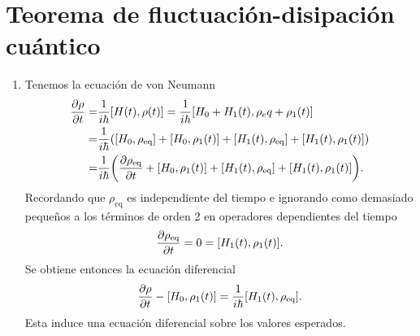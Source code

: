 \documentclass{article}
\begin{document}
\section{Teorema de fluctuación-disipación cuántico}

\begin{enumerate}

\item Tenemos la ecuación de von Neumann
\begin{align}
\begin{split}
\pdv{\rho}{t} (t)=&\frac{1}{i\hbar}[H(t),\rho(t)]=\frac{1}{i\hbar}[H_0+H_1(t),\rho_eq+\rho_1(t)]\\
=&\frac{1}{i\hbar}\qty([H_0,\rho_{\text{eq}}]+[H_0,\rho_1(t)]+[H_1(t),\rho_{\text{eq}}]+[H_1(t),\rho_1(t)])\\
=&\frac{1}{i\hbar}\qty(\pdv{\rho_{\text{eq}}}{t} (t)+[H_0,\rho_1(t)]+[H_1(t),\rho_{\text{eq}}]+[H_1(t),\rho_1(t)]).
\end{split}
\end{align}
Recordando que $\rho_{\text{eq}}$ es independiente del tiempo e ignorando como demasiado pequeños a los términos de orden 2 en operadores dependientes del tiempo
\begin{equation}
\pdv{\rho_{\text{eq}}}{t} (t)=0=[H_1(t),\rho_1(t)].
\end{equation} 
Se obtiene entonces la ecuación diferencial
\begin{equation}
\pdv{\rho}{t} (t)-[H_0,\rho_1(t)]=\frac{1}{i\hbar}[H_1(t),\rho_{\text{eq}}].
\end{equation}
Esta induce una ecuación diferencial sobre los valores esperados.

\end{enumerate}



\end{document}
